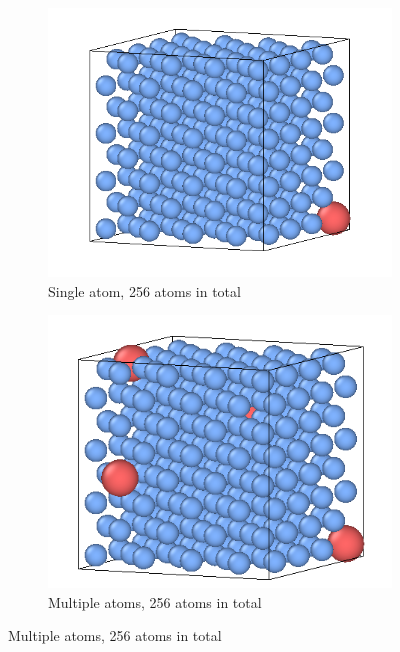 \begin{figure}[htb]
\begin{subfigure}{.42\textwidth}
  \centering
  \includegraphics[width=.94\linewidth]{chapters/potentials_fe_pd_ru/slabs/bulk01.png}  
  \caption{Single atom, 256 atoms in total}
  \label{fig:sub-first}
\end{subfigure}
\begin{subfigure}{.42\textwidth}
  \centering
  \includegraphics[width=.94\linewidth]{chapters/potentials_fe_pd_ru/slabs/bulk02.png}  
  \caption{Multiple atoms, 256 atoms in total}
  \label{fig:sub-first}
\end{subfigure}
\label{fig:binaryalloyconfigurationsbulk}
\end{figure}

